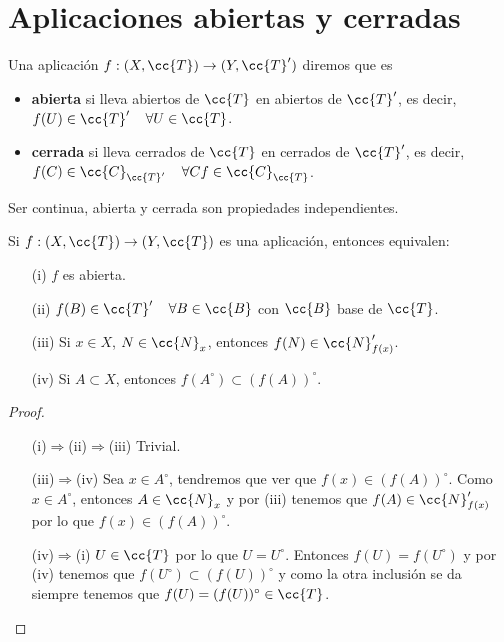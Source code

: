 \section{Aplicaciones abiertas y cerradas}

\begin{definicion}
    Una aplicación $f:(X, \cc{T})\to (Y, \cc{T}')$ diremos que es
    \begin{itemize}
        \item \textbf{abierta} si lleva abiertos de $\cc{T}$ en abiertos de $\cc{T}'$, es decir, $f(U)\in \cc{T}'$\ \ $\forall U \in \cc{T}$.
        \item \textbf{cerrada} si lleva cerrados de $\cc{T}$ en cerrados de $\cc{T}'$, es decir, $f(C)\in \cc{C}_{\cc{T}'}$\ \ $\forall C f\in \cc{C}_{\cc{T}}$.
    \end{itemize}
    \endsquare
\end{definicion}

\begin{observacion}
    Ser continua, abierta y cerrada son propiedades independientes.
    \endsquare
\end{observacion}

\begin{prop}
    Si $f:(X, \cc{T}) \to (Y,\cc{T})$ es una aplicación, entonces equivalen:
    \begin{enumerate}
        \item[(i)] $f$ es abierta.
        \item[(ii)] $f(B)\in \cc{T}'$\ \ $\forall B \in \cc{B}$ con $\cc{B}$ base de $\cc{T}$.
        \item[(iii)] Si  $x\in X$, $N\in \cc{N}_x$, entonces $f(N)\in \cc{N}_{f(x)}'$.
        \item[(iv)] Si $A\subset X$, entonces $f(A^\circ)\subset (f(A))^\circ$.
    \end{enumerate}
    \begin{proof}\
        \begin{itemize}
            \item[(i)$\Rightarrow$(ii)$\Rightarrow$(iii)] Trivial.
            \item[(iii)$\Rightarrow$(iv)] Sea $x\in A^\circ$, tendremos que ver que $f(x)\in (f(A))^\circ$. Como $x\in A^\circ$, entonces $A\in \cc{N}_x$ y por (iii) tenemos que $f(A)\in \cc{N}_{f(x)}'$ por lo que $f(x)\in (f(A))^\circ$.
            \item[(iv)$\Rightarrow$(i)] $U\in \cc{T}$ por lo que $U=U^\circ$. Entonces $f(U) = f(U^\circ)$ y por (iv) tenemos que $f(U^\circ)\subset (f(U))^\circ$  y como la otra inclusión se da siempre tenemos que $f(U)=(f(U))^\circ\in \cc{T}$.
        \end{itemize}
    \end{proof}
\end{prop}

